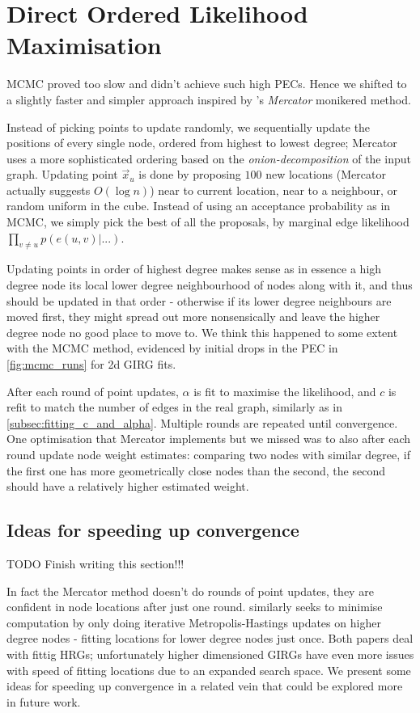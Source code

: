 \section{Direct Ordered Likelihood Maximisation}
\label{sec:direct_ordered_likelihood_maximisation}
MCMC proved too slow and didn't achieve such high PECs. Hence we shifted to a slightly faster and simpler approach inspired by \cite{garcia2019mercator}'s  \textit{Mercator} monikered method.

Instead of picking points to update randomly, we sequentially update the positions of every single node, ordered from highest to lowest degree; Mercator uses a more sophisticated ordering based on the \textit{onion-decomposition} of the input graph. Updating point $\vec{x}_u$ is done by proposing $100$ new locations (Mercator actually suggests $O(\log n)$) near to current location, near to a neighbour, or random uniform in the cube. Instead of using an acceptance probability as in MCMC, we simply pick the best of all the proposals, by marginal edge likelihood $\prod_{v \neq u} p(e(u,v) | ...)$.

Updating points in order of highest degree makes sense as in essence a high degree node  its local lower degree neighbourhood of nodes along with it, and thus should be updated in that order - otherwise if its lower degree neighbours are moved first, they might spread out more nonsensically and leave the higher degree node no good place to move to. We think this happened to some extent with the MCMC method, evidenced by initial drops in the PEC in \cref{fig:mcmc_runs} for 2d GIRG fits.

After each round of point updates, $\alpha$ is fit to maximise the likelihood, and $c$ is refit to match the number of edges in the real graph, similarly as in \cref{subsec:fitting_c_and_alpha}. Multiple rounds are repeated until convergence. One optimisation that Mercator implements but we missed was to also after each round update node weight estimates: comparing two nodes with similar degree, if the first one has more geometrically close nodes than the second, the second should have a relatively higher estimated weight.



\subsection{Ideas for speeding up convergence}
TODO Finish writing this section!!!

In fact the Mercator method doesn't do rounds of point updates, they are confident in node locations after just one round. \cite{boguna2010sustaining} similarly seeks to minimise computation by only doing iterative Metropolis-Hastings updates on higher degree nodes - fitting locations for lower degree nodes just once. Both papers deal with fittig HRGs; unfortunately higher dimensioned GIRGs have even more issues with speed of fitting locations due to an expanded search space. We present some ideas for speeding up convergence in a related vein that could be explored more in future work.

